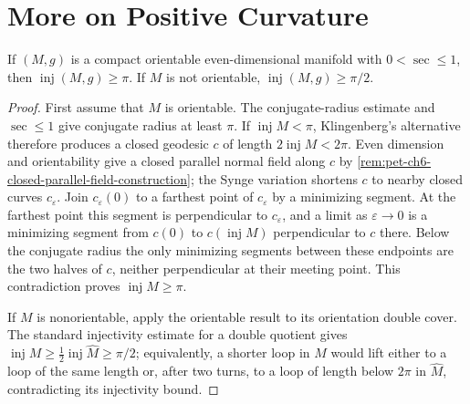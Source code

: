 \section{More on Positive Curvature}

\begin{theorem}
  \label{thm:pet-ch6-klingenberg-even-dim-injectivity}


  If $(M,g)$ is a compact orientable even-dimensional manifold with
  $0<\sec\le1$, then $\operatorname{inj}(M,g)\ge\pi$. If $M$ is not orientable,
  $\operatorname{inj}(M,g)\ge\pi/2$.
\end{theorem}
\begin{proof}
  \sketch
  First assume that $M$ is orientable. The conjugate-radius estimate and
  $\sec\le1$ give conjugate radius at least $\pi$. If
  $\operatorname{inj}M<\pi$, Klingenberg's alternative therefore produces a
  closed geodesic $c$ of length $2\operatorname{inj}M<2\pi$. Even dimension and
  orientability give a closed parallel normal field along $c$ by
  \cref{rem:pet-ch6-closed-parallel-field-construction}; the Synge variation
  shortens $c$ to nearby closed curves $c_\varepsilon$. Join
  $c_\varepsilon(0)$ to a farthest point of $c_\varepsilon$ by a minimizing
  segment. At the farthest point this segment is perpendicular to
  $c_\varepsilon$, and a limit as $\varepsilon\to0$ is a minimizing segment
  from $c(0)$ to $c(\operatorname{inj}M)$ perpendicular to $c$ there. Below
  the conjugate radius the only minimizing segments between these endpoints
  are the two halves of $c$, neither perpendicular at their meeting point.
  This contradiction proves $\operatorname{inj}M\ge\pi$.

  If $M$ is nonorientable, apply the orientable result to its orientation
  double cover. The standard injectivity estimate for a double quotient gives
  $\operatorname{inj}M\ge\tfrac12\operatorname{inj}\widehat M\ge\pi/2$;
  equivalently, a shorter loop in $M$ would lift either to a loop of the same
  length or, after two turns, to a loop of length below $2\pi$ in
  $\widehat M$, contradicting its injectivity bound.
\end{proof}

